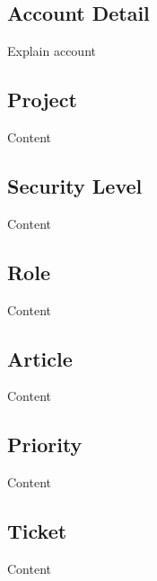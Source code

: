 \subsection{Account Detail}

Explain account


\subsection{Project}

Content


\subsection{Security Level}

Content


\subsection{Role}

Content


\subsection{Article}

Content


\subsection{Priority}

Content



\subsection{Ticket}

Content


